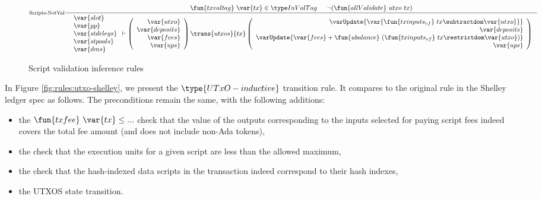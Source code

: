 \begin{figure}[htb]
\begin{equation}
{    }
  \end{equation}
  \begin{equation}
    \inference[Scripts-NotVal]
    {
    \fun{txvaltag}~\var{tx} \in \InValTag &
    \neg (\fun{allValidate}~{utxo}~{tx} ) \\
    }
    {
    \begin{array}{l}
      \var{slot}\\
      \var{pp}\\
      \var{stdelegs}\\
      \var{stpools}\\
      \var{dms}\\
    \end{array}
      \vdash
      \left(
      \begin{array}{r}
        \var{utxo} \\
        \var{deposits} \\
        \var{fees} \\
        \var{ups} \\
      \end{array}
      \right)
      \trans{utxos}{tx}
      \left(
      \begin{array}{r}
        \varUpdate{\var{\fun{txinputs_{vf}}~{tx} \subtractdom \var{utxo}}}  \\
        \var{deposits} \\
        \varUpdate{\var{fees} + \fun{ubalance}~(\fun{txinputs_{vf}}~{tx}\restrictdom \var{utxo})} \\
        \var{ups} \\
      \end{array}
      \right)
    }
  \end{equation}
  \caption{Script validation inference rules}
  \label{fig:rules:utxo-scrval}
\end{figure}

In Figure \ref{fig:rules:utxo-shelley}, we present the $\type{UTxO-inductive}$
transition rule. It compares to the original rule in the Shelley ledger spec
as follows. The preconditions remain the same, with the following additions:

\begin{itemize}
  \item the $\fun{txfee}~\var{tx} \leq ...$ check
  that the value of the outputs corresponding to the inputs selected
  for paying script fees indeed covers the total fee amount (and does not
  include non-Ada tokens),

  \item the check that the execution units for a given script are less than
  the allowed maximum,

  \item the check that the hash-indexed data scripts in the
  transaction indeed correspond to their hash indexes,

  \item the UTXOS state transition.
\end{itemize}

